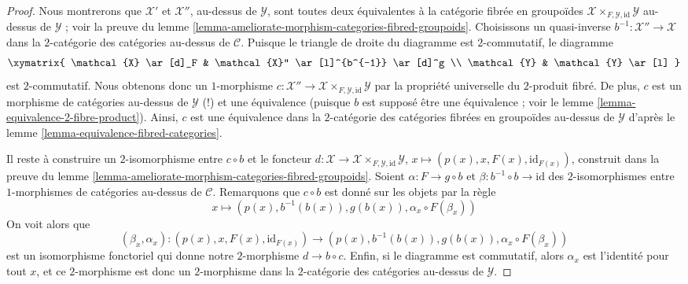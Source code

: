 \begin{proof}
Nous montrerons que $\mathcal{X}'$ et $\mathcal{X}''$, au-dessus de $\mathcal{Y}$,
sont toutes deux équivalentes à la catégorie fibrée en groupoïdes
$\mathcal{X} \times_{F, \mathcal{Y}, \text{id}} \mathcal{Y}$
au-dessus de $\mathcal{Y}$ ; voir la preuve du
lemme \ref{lemma-ameliorate-morphism-categories-fibred-groupoids}.
Choisissons un quasi-inverse $b^{-1} : \mathcal{X}'' \to \mathcal{X}$ dans la
$2$-catégorie des catégories au-dessus de $\mathcal{C}$.
Puisque le triangle de droite du diagramme est $2$-commutatif, le diagramme
$$
\xymatrix{
\mathcal{X} \ar[d]_F & \mathcal{X}'' \ar[l]^{b^{-1}} \ar[d]^g \\
\mathcal{Y} & \mathcal{Y} \ar[l]
}
$$
est $2$-commutatif. Nous obtenons donc un $1$-morphisme
$c : \mathcal{X}'' \to
\mathcal{X} \times_{F, \mathcal{Y}, \text{id}} \mathcal{Y}$
par la propriété universelle du $2$-produit fibré. De plus, $c$
est un morphisme de catégories au-dessus de $\mathcal{Y}$ (!) et une équivalence
(puisque $b$ est supposé être une équivalence ; voir le
lemme \ref{lemma-equivalence-2-fibre-product}).
Ainsi, $c$ est une équivalence dans la $2$-catégorie des catégories fibrées
en groupoïdes au-dessus de $\mathcal{Y}$ d'après le
lemme \ref{lemma-equivalence-fibred-categories}.

\medskip\noindent
Il reste à construire un $2$-isomorphisme entre $c \circ b$ et
le foncteur $d : \mathcal{X} \to
\mathcal{X} \times_{F, \mathcal{Y}, \text{id}} \mathcal{Y}$,
$x \mapsto (p(x), x, F(x), \text{id}_{F(x)})$,
construit dans la preuve du
lemme \ref{lemma-ameliorate-morphism-categories-fibred-groupoids}.
Soient $\alpha : F \to g \circ b$ et $\beta : b^{-1} \circ b \to \text{id}$
des $2$-isomorphismes entre $1$-morphismes de catégories au-dessus de $\mathcal{C}$.
Remarquons que $c \circ b$ est donné sur les objets par la règle
$$
x \mapsto (p(x), b^{-1}(b(x)), g(b(x)), \alpha_x \circ F(\beta_x))
$$
On voit alors que
$$
(\beta_x, \alpha_x) :
(p(x), x, F(x), \text{id}_{F(x)})
\longrightarrow
(p(x), b^{-1}(b(x)), g(b(x)), \alpha_x \circ F(\beta_x))
$$
est un isomorphisme fonctoriel qui donne notre $2$-morphisme
$d \to b \circ c$. Enfin, si le diagramme est commutatif, alors
$\alpha_x$ est l'identité pour tout $x$, et ce
$2$-morphisme est donc un $2$-morphisme dans la $2$-catégorie des catégories
au-dessus de $\mathcal{Y}$.
\end{proof}


































